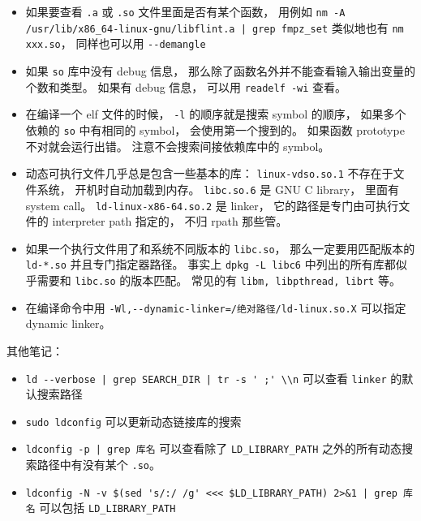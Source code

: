 \begin{itemize}
\item 如果要查看 \verb`.a` 或 \verb`.so` 文件里面是否有某个函数， 用例如 \verb`nm -A /usr/lib/x86_64-linux-gnu/libflint.a | grep fmpz_set` 类似地也有 \verb`nm xxx.so`， 同样也可以用 \verb`--demangle`
\item 如果 \verb`so` 库中没有 debug 信息， 那么除了函数名外并不能查看输入输出变量的个数和类型。 如果有 debug 信息， 可以用 \verb`readelf -wi` 查看。
\item 在编译一个 elf 文件的时候， \verb`-l` 的顺序就是搜索 symbol 的顺序， 如果多个依赖的 \verb`so` 中有相同的 symbol， 会使用第一个搜到的。 如果函数 prototype 不对就会运行出错。 注意不会搜索间接依赖库中的 symbol。
\item 动态可执行文件几乎总是包含一些基本的库： \verb`linux-vdso.so.1` 不存在于文件系统， 开机时自动加载到内存。 \verb`libc.so.6` 是 GNU C library， 里面有 system call。 \verb`ld-linux-x86-64.so.2` 是 linker， 它的路径是专门由可执行文件的 interpreter path 指定的， 不归 rpath 那些管。
\item 如果一个执行文件用了和系统不同版本的 \verb`libc.so`， 那么一定要用匹配版本的 \verb`ld-*.so` 并且专门指定器路径。 事实上 \verb`dpkg -L libc6` 中列出的所有库都似乎需要和 \verb`libc.so` 的版本匹配。 常见的有 \verb`libm, libpthread, librt` 等。
\item 在编译命令中用 \verb`-Wl,--dynamic-linker=/绝对路径/ld-linux.so.X` 可以指定 dynamic linker。
\end{itemize}

其他笔记：
\begin{itemize}
\item \verb`ld --verbose | grep SEARCH_DIR | tr -s ' ;' \\n` 可以查看 \verb`linker` 的默认搜索路径
\item \verb`sudo ldconfig` 可以更新动态链接库的搜索
\item \verb`ldconfig -p | grep 库名` 可以查看除了 \verb`LD_LIBRARY_PATH` 之外的所有动态搜索路径中有没有某个 \verb`.so`。
\item \verb`ldconfig -N -v $(sed 's/:/ /g' <<< $LD_LIBRARY_PATH) 2>&1 | grep 库名` 可以包括 \verb`LD_LIBRARY_PATH`
\end{itemize}

